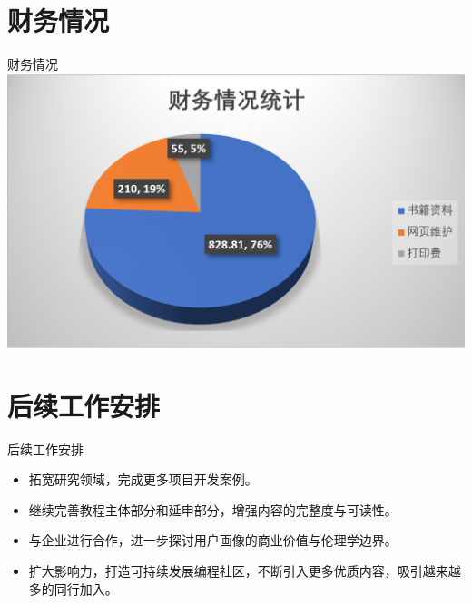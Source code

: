 \documentclass[10pt]{beamer}
\begin{document}
\section{财务情况}
  \begin{frame}{财务情况}
  \includegraphics[height=0.66\paperheight]{finance}
  \end{frame}


\section{后续工作安排}
\begin{frame}{后续工作安排}
  \begin{itemize}
    \item 拓宽研究领域，完成更多项目开发案例。\newline
    \item 继续完善教程主体部分和延申部分，增强内容的完整度与可读性。\newline
    \item 与企业进行合作，进一步探讨用户画像的商业价值与伦理学边界。\newline
    \item 扩大影响力，打造可持续发展编程社区，不断引入更多优质内容，吸引越来越多的同行加入。
  \end{itemize}

\end{frame}


\end{document}
